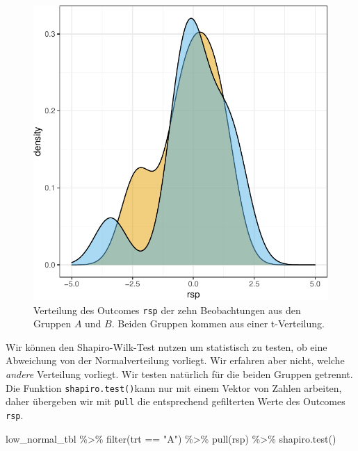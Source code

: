 \documentclass[
  letterpaper,
]{scrbook}
\newenvironment{Shaded}{\begin{snugshade}}{\end{snugshade}}
\newcommand{\FunctionTok}[1]{\textcolor[rgb]{0.28,0.35,0.67}{#1}}
\newcommand{\NormalTok}[1]{\textcolor[rgb]{0.00,0.23,0.31}{#1}}
\newcommand{\SpecialCharTok}[1]{\textcolor[rgb]{0.37,0.37,0.37}{#1}}
\newcommand{\StringTok}[1]{\textcolor[rgb]{0.13,0.47,0.30}{#1}}
\begin{document}
\begin{figure}
\begin{minipage}[t]{0.50\linewidth}
{{\includegraphics{./stat-tests-pretest_files/figure-pdf/fig-normal-1-2.pdf}

}

}

\end{minipage}%

\caption{\label{fig-normal-1}Verteilung des Outcomes \texttt{rsp} der
zehn Beobachtungen aus den Gruppen \(A\) und \(B\). Beiden Gruppen
kommen aus einer t-Verteilung.}

\end{figure}

Wir können den Shapiro-Wilk-Test nutzen um statistisch zu testen, ob
eine Abweichung von der Normalverteilung vorliegt. Wir erfahren aber
nicht, welche \emph{andere} Verteilung vorliegt. Wir testen natürlich
für die beiden Gruppen getrennt. Die Funktion
\texttt{shapiro.test()}kann nur mit einem Vektor von Zahlen arbeiten,
daher übergeben wir mit \texttt{pull} die entsprechend gefilterten Werte
des Outcomes \texttt{rsp}.

\begin{Shaded}
\begin{Highlighting}[]
\NormalTok{low\_normal\_tbl }\SpecialCharTok{\%\textgreater{}\%} 
  \FunctionTok{filter}\NormalTok{(trt }\SpecialCharTok{==} \StringTok{"A"}\NormalTok{) }\SpecialCharTok{\%\textgreater{}\%} 
  \FunctionTok{pull}\NormalTok{(rsp) }\SpecialCharTok{\%\textgreater{}\%} 
  \FunctionTok{shapiro.test}\NormalTok{()}
\end{Highlighting}
\end{Shaded}
\end{document}
